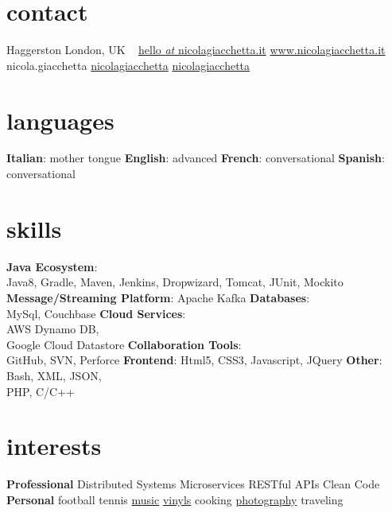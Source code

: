 
\newcommand*{\img}[1]{%
    \raisebox{-.1\baselineskip}{%
        \texttt{[image: \#1]}%
    }%
}



\begin{aside} %
\section{\normalfont contact}
\img{img_tube.png} Haggerston
London, UK
~
\myNumberUK
\href{mailto:\myEmail}{hello {\emph{at}} nicolagiacchetta.it}
\href{http://www.nicolagiacchetta.it/}{www.nicolagiacchetta.it}
\raisebox{-0.4ex}{\skype{}} nicola.giacchetta
 \hspace{0.02cm} \href{https://github.com/nicolagiacchetta}{ nicolagiacchetta}
 \hspace{0.02cm} \href{https://www.linkedin.com/in/nicolagiacchetta}{ nicolagiacchetta}
~
\vspace{-0.1cm}
\section{\normalfont languages}
\textbf{Italian}: mother tongue
\textbf{English}: advanced
\textbf{French}: conversational
\textbf{Spanish}: conversational
~
\vspace{-0.1cm}
\section{\normalfont skills}
\textbf{Java Ecosystem}:\\ Java8, Gradle, Maven, Jenkins, Dropwizard, Tomcat, JUnit, Mockito
\textbf{Message/Streaming Platform}: Apache Kafka
\textbf{Databases}:\\ MySql, Couchbase
\textbf{Cloud Services}:\\ AWS Dynamo DB,\\ Google Cloud Datastore
\textbf{Collaboration Tools}:\\ GitHub, SVN, Perforce 
\textbf{Frontend}: Html5, CSS3, Javascript, JQuery
\textbf{Other}: Bash, XML, JSON,\\ PHP, C/C++ 
~
\vspace{-0.1cm}
\section{\normalfont interests}
\textbf{Professional}
Distributed Systems
Microservices
RESTful APIs
Clean Code
~
\vspace{-0.1cm}
\textbf{Personal}
football
tennis
\href{https://open.spotify.com/user/1171479957}{music}
\href{https://www.discogs.com/user/little_jacket/collection}{vinyls}
cooking
\href{https://www.flickr.com/photos/nicolagiacchetta}{photography}
traveling
~
\end{aside}


